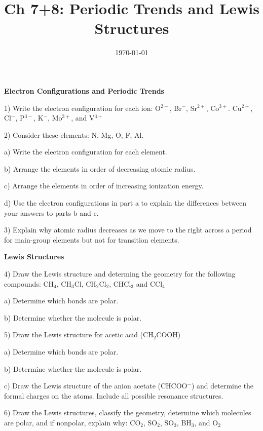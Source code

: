 \documentclass[12pt]{article}
\title{\textbf{Ch 7+8: Periodic Trends and Lewis Structures}}
\date{\today}
\begin{document}
\maketitle 

\textbf{Electron Configurations and Periodic Trends}

1) Write the electron configuration for each ion:
O$^{2-}$, Br$^-$, Sr$^{2+}$, Co$^{3+}$. Cu$^{2+}$, Cl$^-$, P$^{3-}$,
K$^-$, Mo$^{3+}$, and V$^{3+}$

2) Consider these elements: N, Mg, O, F, Al.

a) Write the electron configuration for each element.

b) Arrange the elements in order of decreasing atomic radius.

c) Arrange the elements in order of increasing ionization energy.

d) Use the electron configurations in part a to explain the
differences between your answers to parts b and c.
\vspace{2in}

3) Explain why atomic radius decreases as we move to the right
across a period for main-group elements but not for transition
elements.

\newpage

\textbf{Lewis Structures}

4) Draw the Lewis structure and determing the geometry for the following
compounds: CH$_4$, CH$_3$Cl, CH$_2$Cl$_2$,  CHCl$_3$ and CCl$_4$

a) Determine which bonds are polar.

b) Determine whether the molecule is polar.

\vspace{1.5in}

5) Draw the Lewis structure for acetic acid (CH$_2$COOH)

a) Determine which bonds are polar.

b) Determine whether the molecule is polar.

c) Draw the Lewis structure of the anion acetate (CHCOO$^-$)
and determine the formal charges on the atoms. Include all possible
resonance structures.

\vspace{1.5in}

6) Draw the Lewis structures, classify the geometry, determine which molecules
are polar, and if nonpolar, explain why: CO$_2$, SO$_2$, SO$_3$, BH$_3$, and O$_2$
\end{document}
